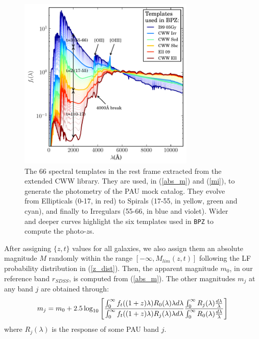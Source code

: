 \begin{figure}
\centering
\includegraphics[width=84mm]{./plots/pau_templates.pdf}
\caption{The 66 spectral templates in the rest frame extracted from the extended CWW library. They are used, in (\ref{abs_m}) and (\ref{mi}), to generate the photometry of the PAU mock catalog. They evolve from Ellipticals (0-17, in red) to Spirals (17-55, in yellow, green and cyan), and finally to Irregulars (55-66, in blue and violet). Wider and deeper curves highlight the six templates used in \texttt{BPZ} to compute the photo-$z$s.}
\label{pau_templates}
\end{figure}

After assigning $\lbrace z,t \rbrace$ values for all galaxies, we also assign them an absolute magnitude $M$ randomly within the range $[-\infty, M_{lim}(z,t)]$ following the LF probability distribution in (\ref{z_dist}). Then, the apparent magnitude $m_0$, in our reference band $r_{SDSS}$, is computed from (\ref{abs_m}). The other magnitudes $m_j$ at any band $j$ are obtained through:
\begin{equation}
m_j = m_0 + 2.5 \log_{10} \left[ {\int^{\infty}_{0} f_t((1+z)\lambda) R_0(\lambda)\lambda d\lambda \over \int^{\infty}_{0} f_t((1+z)\lambda) R_j(\lambda)\lambda d\lambda} {\int^{\infty}_{0} R_j(\lambda) {d\lambda \over \lambda} \over \int^{\infty}_{0} R_0(\lambda) {d\lambda \over \lambda}}\right]
\label{mi}
\end{equation}
where $R_j(\lambda)$ is the response of some PAU band $j$.

